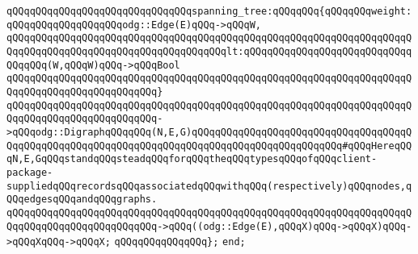 \verb|qQQqqQQqqQQqqQQqqQQqqQQqqQQqqQQqspanning_tree:qQQqqQQq{qQQqqQQqweight:qQQqqQQqqQQqqQQqqQQqodg::Edge(E)qQQq->qQQqW,|\newline
\verb|qQQqqQQqqQQqqQQqqQQqqQQqqQQqqQQqqQQqqQQqqQQqqQQqqQQqqQQqqQQqqQQqqQQqqQQqqQQqqQQqqQQqqQQqqQQqqQQqqQQqqQQqqQQqlt:qQQqqQQqqQQqqQQqqQQqqQQqqQQqqQQqqQQq(W,qQQqW)qQQq->qQQqBool|\newline
\verb|qQQqqQQqqQQqqQQqqQQqqQQqqQQqqQQqqQQqqQQqqQQqqQQqqQQqqQQqqQQqqQQqqQQqqQQqqQQqqQQqqQQqqQQqqQQqqQQq}|\newline
\verb|qQQqqQQqqQQqqQQqqQQqqQQqqQQqqQQqqQQqqQQqqQQqqQQqqQQqqQQqqQQqqQQqqQQqqQQqqQQqqQQqqQQqqQQqqQQqqQQq->qQQqodg::DigraphqQQqqQQq(N,E,G)qQQqqQQqqQQqqQQqqQQqqQQqqQQqqQQqqQQqqQQqqQQqqQQqqQQqqQQqqQQqqQQqqQQqqQQqqQQqqQQqqQQqqQQqqQQqqQQq#qQQqHereqQQqN,E,GqQQqstandqQQqsteadqQQqforqQQqtheqQQqtypesqQQqofqQQqclient-package-suppliedqQQqrecordsqQQqassociatedqQQqwithqQQq(respectively)qQQqnodes,qQQqedgesqQQqandqQQqgraphs.|\newline
\verb|qQQqqQQqqQQqqQQqqQQqqQQqqQQqqQQqqQQqqQQqqQQqqQQqqQQqqQQqqQQqqQQqqQQqqQQqqQQqqQQqqQQqqQQqqQQqqQQq->qQQq((odg::Edge(E),qQQqX)qQQq->qQQqX)qQQq->qQQqXqQQq->qQQqX;|\newline
\verb|qQQqqQQqqQQqqQQq};|\newline
\verb|end;|\newline


